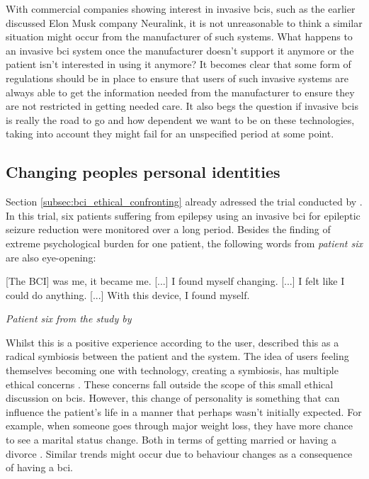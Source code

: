 With commercial companies showing interest in invasive \glspl{bci}, such as the earlier discussed Elon Musk company Neuralink, it is not unreasonable to think a similar situation might occur from the manufacturer of such systems.
What happens to an invasive \gls{bci} system once the manufacturer doesn't support it anymore or the patient isn't interested in using it anymore?
It becomes clear that some form of regulations should be in place to ensure that users of such invasive systems are always able to get the information needed from the manufacturer to ensure they are not restricted in getting needed care.
It also begs the question if invasive \glspl{bci} is really the road to go and how dependent we want to be on these technologies, taking into account they might fail for an unspecified period at some point.


\subsection{Changing peoples personal identities}
\label{subsec:bci_ethical_identity}

Section \ref{subsec:bci_ethical_confronting} already adressed the trial conducted by \citet{first_bci_trial}.
In this trial, six patients suffering from epilepsy using an invasive \gls{bci} for epileptic seizure reduction were monitored over a long period.
Besides the finding of extreme psychological burden for one patient, the following words from \textit{patient six} are also eye-opening:

\setlength{\epigraphwidth}{0.9\textwidth}
\epigraph{[The BCI] was me, it became me. [...] I found myself changing. [...] I felt like I could do anything. [...] With this device, I found myself. }{\textit{Patient six from the study by \citet{first_bci_trial}}}

Whilst this is a positive experience according to the user, \citet{first_bci_trial} described this as a radical symbiosis between the patient and the system.
The idea of users feeling themselves becoming one with technology, creating a symbiosis, has multiple ethical concerns \citep{ethics_of_bci}.
These concerns fall outside the scope of this small ethical discussion on \glspl{bci}.
However, this change of personality is something that can influence the patient's life in a manner that perhaps wasn't initially expected.
For example, when someone goes through major weight loss, they have more chance to see a marital status change.
Both in terms of getting married or having a divorce \citep{weight_loss_divorce}.
Similar trends might occur due to behaviour changes as a consequence of having a \gls{bci}.

